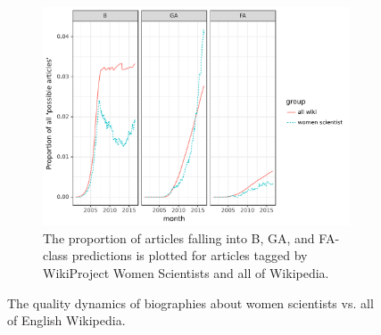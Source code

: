 \begin{figure}[p]
\begin{subfigure}[t]{\columnwidth}
  \label{fig:proportion_empty2c_ws_vs_all}
\end{subfigure}~~
\begin{subfigure}[t]{\columnwidth}
  \centering
  \includegraphics[width=.9\textwidth]{figures/proportion_b2fa_ws_vs_all}
  \caption{The proportion of articles falling into B, GA, and FA-class predictions is plotted for articles tagged by WikiProject Women Scientists and all of Wikipedia.}
  \label{fig:proportion_b2fa_ws_vs_all}
\end{subfigure}
\caption{The quality dynamics of biographies about women scientists vs. all of English Wikipedia.}
\label{fig:ws_vs_all}
\end{figure}
